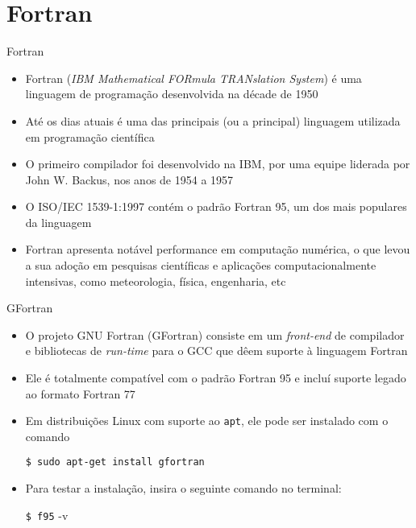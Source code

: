\section{Fortran}

\begin{frame}[fragile]{Fortran}

    \begin{itemize}
        \item Fortran (\textit{IBM Mathematical FORmula TRANslation System}) é uma linguagem de
            programação desenvolvida na décade de 1950 

        \item Até os dias atuais é uma das principais (ou a principal) linguagem utilizada em
            programação científica

        \item O primeiro compilador foi desenvolvido na IBM, por uma equipe liderada por
            John W. Backus, nos anos de 1954 a 1957

        \item O ISO/IEC 1539-1:1997 contém o padrão Fortran 95, um dos mais populares da linguagem

        \item Fortran apresenta notável performance em computação numérica, o que levou a sua
            adoção em pesquisas científicas e aplicações computacionalmente intensivas, como
            meteorologia, física, engenharia, etc
    \end{itemize}

\end{frame}
\begin{frame}[fragile]{GFortran}

    \begin{itemize}
        \item O projeto GNU Fortran (GFortran) consiste em um \textit{front-end} de compilador e 
            bibliotecas de \textit{run-time} para o GCC que dêem suporte à linguagem Fortran
            
        \item Ele é totalmente compatível com o padrão Fortran 95 e incluí suporte legado ao
            formato Fortran 77

        \item Em distribuições Linux com suporte ao \texttt{apt}, ele pode ser instalado com o
        comando
        \begin{center}
            \verb|$ sudo apt-get install gfortran|
        \end{center}

        \item Para testar a instalação, insira o seguinte comando no terminal:
        \begin{center}
            \verb|$ f95| -v
        \end{center}
    \end{itemize}

\end{frame}

